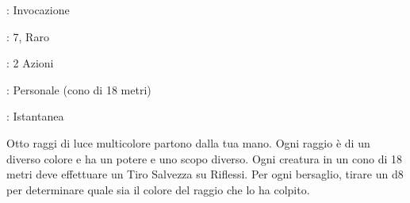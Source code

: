 \begin{multicols}{2}
\noindent\colorbox{OBSSgold!10}{
\begin{minipage}{0.95\linewidth}
\begin{description}[noitemsep, topsep=0pt, parsep=0pt, partopsep=0pt, leftmargin=0cm, labelwidth=1.3cm]
	\item[\textbf{Lista}]: Invocazione
	\item[\textbf{Livello}]: 7, Raro
	\item[\textbf{Lancio}]: 2 Azioni
	\item[\textbf{Gittata}]: Personale (cono di 18 metri)
	\item[\textbf{Durata}]: Istantanea
\end{description}
\end{minipage}}\smallskip

Otto raggi di luce multicolore partono dalla tua mano. Ogni raggio è di un diverso colore e ha un potere e uno scopo diverso. Ogni creatura in un cono di 18 metri deve effettuare un Tiro Salvezza su Riflessi. Per ogni bersaglio, tirare un d8 per determinare quale sia il colore del raggio che lo ha colpito.


\end{multicols}
